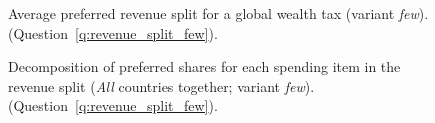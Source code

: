 \begin{figure}[h!]
    \caption[Average preferred revenue split (\textit{few})]{Average preferred revenue split for a global wealth tax (variant \textit{few}). (Question~\ref{q:revenue_split_few}).
    }\label{fig:split_few_bars_nb0}
\end{figure}

\begin{figure}[h!]
    \caption[Decomposition of preferred spendings in revenue split]{Decomposition of preferred shares for each spending item in the revenue split (\textit{All} countries together; variant \textit{few}). (Question~\ref{q:revenue_split_few}).
    }\label{fig:split_few}
\end{figure}

